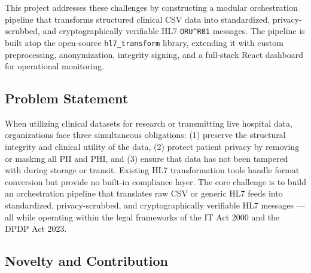 \documentclass[12pt,a4paper]{report}
\begin{document}
This project addresses these challenges by constructing a modular orchestration pipeline
that transforms structured clinical CSV data into standardized, privacy-scrubbed, and
cryptographically verifiable HL7 \texttt{ORU\string^R01} messages. The pipeline is
built atop the open-source \texttt{hl7\_transform} library, extending it with custom
preprocessing, anonymization, integrity signing, and a full-stack React dashboard for
operational monitoring.

\subsection*{Problem Statement}

When utilizing clinical datasets for research or transmitting live hospital data,
organizations face three simultaneous obligations: (1) preserve the structural integrity
and clinical utility of the data, (2) protect patient privacy by removing or masking all
PII and PHI, and (3) ensure that data has not been tampered with during storage or
transit. Existing HL7 transformation tools handle format conversion but provide no
built-in compliance layer. The core challenge is to build an orchestration pipeline that
translates raw CSV or generic HL7 feeds into standardized, privacy-scrubbed, and
cryptographically verifiable HL7 messages --- all while operating within the legal
frameworks of the IT Act 2000 and the DPDP Act 2023.

\subsection*{Novelty and Contribution}
\end{document}
